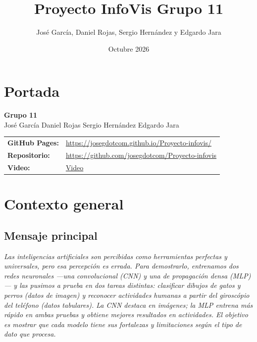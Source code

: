 \documentclass{article}
\title{Proyecto InfoVis \textbf{Grupo 11}}
\author{Jos\'{e} Garc\'{i}a, Daniel Rojas, Sergio Hern\'{a}ndez y Edgardo Jara}
\date{Octubre 2026}
\begin{document}
\maketitle

\section*{Portada}

\begin{center}
  \Large\textbf{Grupo 11} \\[0.5em]
  \normalsize
  Jos\'{e} Garc\'{i}a \quad Daniel Rojas \quad Sergio Hern\'{a}ndez \quad Edgardo Jara \\[1em]
  \begin{tabular}{ll}
    \textbf{GitHub Pages:}  & \url{https://josegdotcom.github.io/Proyecto-infovis/} \\[0.3em]
    \textbf{Repositorio:}   & \url{https://github.com/josegdotcom/Proyecto-infovis} \\[0.3em]
    \textbf{Video:}         & \href{https://josegdotcom.github.io/Proyecto-infovis/evidencia2/video1/video1.mp4}{Video} \\
  \end{tabular}
\end{center}

\newpage
\tableofcontents
\newpage

\section{Contexto general}

\subsection{Mensaje principal}

\textit{
Las inteligencias artificiales son percibidas como herramientas perfectas y universales, pero
esa percepci\'{o}n es errada.
Para demostrarlo, entrenamos dos redes neuronales ---una convolucional (CNN) y una de
propagaci\'{o}n densa (MLP)--- y las pusimos a prueba en dos tareas distintas: clasificar
dibujos de gatos y perros (datos de imagen) y reconocer actividades humanas a partir del
girosc\'{o}pio del tel\'{e}fono (datos tabulares).
La CNN destaca en im\'{a}genes; la MLP entrena m\'{a}s r\'{a}pido en ambas pruebas y
obtiene mejores resultados en actividades.
El objetivo es mostrar que cada modelo tiene sus fortalezas y limitaciones seg\'{u}n el
tipo de dato que procesa.
}
\end{document}
